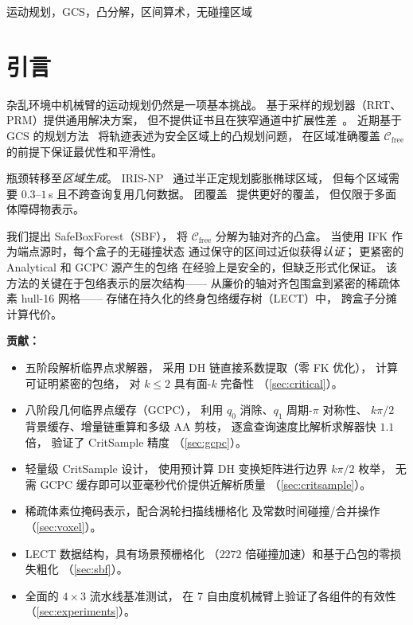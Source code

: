 \documentclass[journal]{IEEEtran}
\newcommand{\Cfree}{\mathcal{C}_\text{free}}
\begin{document}
\begin{IEEEkeywords}
运动规划，GCS，凸分解，区间算术，无碰撞区域
\end{IEEEkeywords}

\section{引言}\label{sec:intro}

杂乱环境中机械臂的运动规划仍然是一项基本挑战。
基于采样的规划器（RRT、PRM）提供通用解决方案，
但不提供证书且在狭窄通道中扩展性差~\cite{lavalle2006planning}。
近期基于 GCS 的规划方法~\cite{marcucci2024motion}
将轨迹表述为安全区域上的凸规划问题，
在区域准确覆盖 $\Cfree$ 的前提下保证最优性和平滑性。

瓶颈转移至\emph{区域生成}。
IRIS-NP~\cite{werner2024fast} 通过半正定规划膨胀椭球区域，
但每个区域需要 $0.3$--$1$\,s 且不跨查询复用几何数据。
团覆盖~\cite{amice2024clique} 提供更好的覆盖，
但仅限于多面体障碍物表示。

我们提出 SafeBoxForest（SBF），
将 $\Cfree$ 分解为轴对齐的凸盒。
当使用 IFK 作为端点源时，每个盒子的无碰撞状态
通过保守的区间过近似获得\emph{认证}；
更紧密的 Analytical 和 GCPC 源产生的包络
在经验上是安全的，但缺乏形式化保证。
该方法的关键在于包络表示的层次结构——
从廉价的轴对齐包围盒到紧密的稀疏体素 hull-16 网格——
存储在持久化的终身包络缓存树（LECT）中，
跨盒子分摊计算代价。

\textbf{贡献：}
\begin{itemize}
  \item 五阶段解析临界点求解器，
    采用 DH 链直接系数提取（零 FK 优化），
    计算可证明紧密的包络，
    对 $k \leq 2$ 具有面-$k$ 完备性
    （\cref{sec:critical}）。
  \item 八阶段几何临界点缓存（GCPC），
    利用 $q_0$ 消除、$q_1$ 周期-$\pi$ 对称性、
    $k\pi/2$ 背景缓存、增量链重算和多级 AA 剪枝，
    逐盒查询速度比解析求解器快 $1.1$ 倍，
    验证了 CritSample 精度
    （\cref{sec:gcpc}）。
  \item 轻量级 CritSample 设计，
    使用预计算 DH 变换矩阵进行边界 $k\pi/2$ 枚举，
    无需 GCPC 缓存即可以亚毫秒代价提供近解析质量
    （\cref{sec:critsample}）。
  \item 稀疏体素位掩码表示，配合涡轮扫描线栅格化
    及常数时间碰撞/合并操作
    （\cref{sec:voxel}）。
  \item LECT 数据结构，具有场景预栅格化
    （$2272$ 倍碰撞加速）和基于凸包的零损失粗化
    （\cref{sec:sbf}）。
  \item 全面的 $4{\times}3$ 流水线基准测试，
    在 7 自由度机械臂上验证了各组件的有效性
    （\cref{sec:experiments}）。
\end{itemize}
\end{document}
